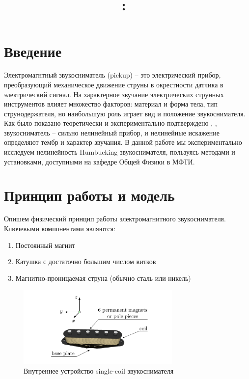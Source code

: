 \documentclass{article}
\title{
    \vspace{2in}
    \textmd{\textbf{\docClass:\ \docTitle}}\\
    \vspace{3in}
}
\author{\docAuthorName}
\date{}
\begin{document}
\maketitle
\pagebreak

\section{Введение}

Электромагнтный звукосниматель (pickup) -- это электрический прибор, преобразующий механическое движение
струны в окрестности датчика в электрический сигнал. На характерное звучание электрических струнных инструментов
влияет множество факторов: материал и форма тела, тип струнодержателя, но наибольшую роль играет вид и положение звукоснимателя.
Как было показано теоретически \cite{acoustics-modeling-of-a-pickup} и экспериментально подтверждено \cite{novak:hal-02512148},
\cite{app7010050}, звукосниматель -- сильно нелинейный прибор, и нелинейные искажение определяют тембр и характер звучания.
В данной работе мы экспериментально исследуем нелинейность Humbucking звукоснимателя, пользуясь методами и установками,
доступными на кафедре Общей Физики в МФТИ.

\section{Принцип работы и модель}

Опишем физический принцип работы электромагнитного звукоснимателя.
Ключевыми компонентами являются:

\begin{enumerate}
    \item Постоянный магнит
    \item Катушка с достаточно большим числом витков
    \item Магнитно-проницаемая струна (обычно сталь или никель)
\end{enumerate}

\begin{figure}[h]
    \centering
    \includegraphics[width=8cm]{drawings/mechanism.png}
    \caption{Внутреннее устройство single-coil звукоснимателя}
\end{figure}
\end{document}
